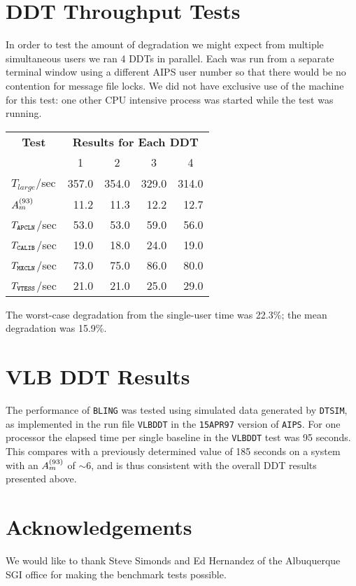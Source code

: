 \section{DDT Throughput Tests}

In order to test the amount of degradation we might expect from multiple
simultaneous users we ran 4 DDTs in parallel.  Each was run from a
separate terminal window using a different AIPS user number so that
there would be no contention for message file locks.  We did not have
exclusive use of the machine for this test: one other CPU intensive
process was started while the test was running.

\begin{tabular}{|l|r|r|r|r|}
\hline
\multicolumn{1}{|c|}{\bf Test} &
\multicolumn{4}{c|}{\bf Results for Each DDT} \\
\cline{2-5}
 & \multicolumn{1}{c|}{1} & \multicolumn{1}{c|}{2} &
   \multicolumn{1}{c|}{3} & \multicolumn{1}{c|}{4} \\
\hline
$T_{large}$/sec & 357.0 & 354.0 & 329.0 & 314.0 \\
$A_m^{(93)}$		& 11.2 & 11.3 & 12.2 & 12.7 \\
\hline
$T_{\tt APCLN}$/sec 	& 53.0 & 53.0 & 59.0 & 56.0 \\
$T_{\tt CALIB}$/sec	& 19.0 & 18.0 & 24.0 & 19.0 \\
$T_{\tt MXCLN}$/sec	& 73.0 & 75.0 & 86.0 & 80.0 \\
$T_{\tt VTESS}$/sec	& 21.0 & 21.0 & 25.0 & 29.0 \\
\hline
\end{tabular}

The worst-case degradation from the single-user time was 22.3\%; the
mean degradation was 15.9\%.

\section{VLB DDT Results}
 The performance of {\tt BLING} was tested using simulated data
generated by {\tt DTSIM}, as implemented in the run file {\tt VLBDDT}
in the {\tt 15APR97} version of {\tt AIPS}. For one processor the
elapsed time per single baseline in the {\tt VLBDDT} test was 95
seconds. This compares with a previously determined value of 185
seconds on a system with an $A_m^{(93)}$ of $\sim 6$, and is thus consistent
with the overall DDT results presented above.

\section{Acknowledgements}
 We would like to thank Steve Simonds and Ed Hernandez of the
Albuquerque SGI office for making the benchmark tests possible.






